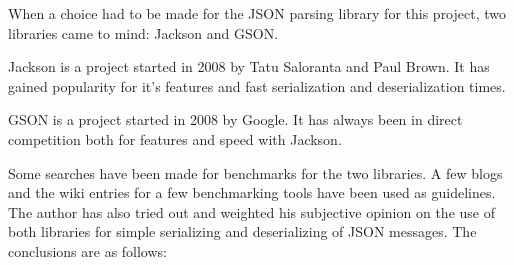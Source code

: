 \documentclass{article}
\begin{document}
When a choice had to be made for the JSON parsing library for this project, two
libraries came to mind: Jackson and GSON.\newline

Jackson is a project started in 2008 by Tatu Saloranta and Paul Brown. It has
gained popularity for it's features and fast serialization and deserialization
times.\newline

GSON is a project started in 2008 by Google. It has always been in direct
competition both for features and speed with Jackson.\newline

Some searches have been made for benchmarks for the two libraries. A few
blogs\cite{jacksonvsgson} \cite{jacksonvsgson2} \cite{jacksonvsgson4} and the
wiki entries for a few benchmarking tools\cite{jacksonvsgson3} \cite{jacksonvsgson5}
have been used as guidelines. The author has also tried out and weighted his
subjective opinion on the use of both libraries for simple serializing and
deserializing of JSON messages. The conclusions are as follows:
\end{document}
